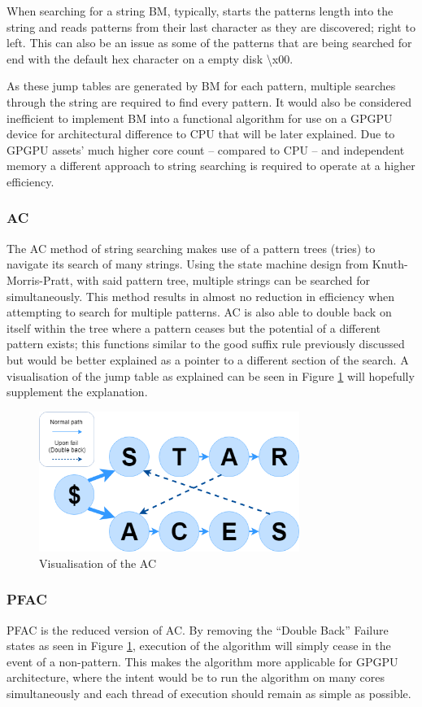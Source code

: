 When searching for a string \ac{BM}, typically, starts the patterns length into the string and reads patterns from their last character as they are discovered; right to left.
This can also be an issue as some of the patterns that are being searched for end with the default hex character on a empty disk {\textbackslash}x00.

As these jump tables are generated by \ac{BM} for each pattern, multiple searches through the string are required to find every pattern.
It would also be considered inefficient to implement BM into a functional algorithm for use on a GPGPU device for architectural difference to CPU that will be later explained. Due to GPGPU assets' much higher core count -- compared to CPU -- and independent memory a different approach to string searching is required to operate at a higher efficiency.

\subsubsection*{\acl{AC}}
The \acf{AC} method of string searching makes use of a pattern trees (tries) to navigate its search of many strings.
Using the state machine design from Knuth-Morris-Pratt, with said pattern tree, multiple strings can be searched for simultaneously.
This method results in almost no reduction in efficiency when attempting to search for multiple patterns.
\ac{AC} is also able to double back on itself within the tree where a pattern ceases but the potential of a different pattern exists; this functions similar to the good suffix rule previously discussed but would be better explained as a pointer to a different section of the search.
A visualisation of the jump table as explained can be seen in Figure \ref{fig:AC_diagram} will hopefully supplement the explanation.
\newpage
\begin{figure}[!ht]
    \centering
    \includegraphics[width=240pt]{Images/AC_Visualisation.png}
    \caption{Visualisation of the \acl{AC}}
    \label{fig:AC_diagram}
\end{figure}
\subsubsection*{\acl{PFAC}}
\label{sec:PFAC}
\acf{PFAC} is the reduced version of \ac{AC}.
By removing the “Double Back” Failure states as seen in Figure \ref{fig:AC_diagram}, execution of the algorithm will simply cease in the event of a non-pattern.
This makes the algorithm more applicable for GPGPU architecture, where the intent would be to run the algorithm on many cores simultaneously and each thread of execution should remain as simple as possible.

